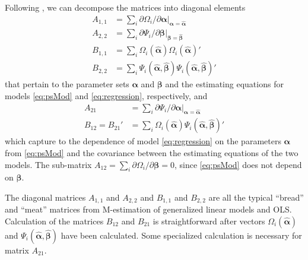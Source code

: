 \documentclass{statsoc} %
\begin{document}
Following , we %
can decompose the matrices into diagonal elements 
\begin{equation*}
    \begin{split}
        A_{1,1}&=\sum_i \partial \Omega_i/\partial \bm{\alpha}|_{\bm{\alpha}=\bm{\hat{\alpha}}}\\
        A_{2,2}&=\sum_i\partial\Psi_i/\partial \bm{\beta}|_{\bm{\beta}=\bm{\hat{\beta}}}\\
        B_{1,1}&=\sum_i\Omega_i(\bm{\hat\alpha})\Omega_i(\bm{\hat\alpha})'\\
        B_{2,2}&=\sum_i \Psi_i(\bm{\hat\alpha},\bm{\hat\beta})\Psi_i(\bm{\hat\alpha},\bm{\hat\beta})'
    \end{split}
\end{equation*}
 that pertain to the parameter sets $\bm{\alpha}$ and $\bm{\beta}$ and the estimating equations for models \eqref{eq:psMod} and  \eqref{eq:regression}, respectively, and 
 \begin{equation*}
     \begin{split}
         A_{21}&=\sum_i\partial\Psi_i/\partial \bm{\alpha}|_{\bm{\alpha}=\bm{\hat{\alpha}}}\\
         B_{12}=B_{21}'&=\sum_i \Omega_i(\bm{\hat{\alpha}})\Psi_i(\bm{\hat{\alpha}},\bm{\hat{\beta}})'
     \end{split}
 \end{equation*}
 which capture to the dependence of model \eqref{eq:regression} on the parameters $\bm{\alpha}$ from \eqref{eq:psMod} and the covariance between the estimating equations of the two models. 
The sub-matrix $A_{12}=\sum_i \partial \Omega_i/\partial \bm{\beta}=0$, since \eqref{eq:psMod} does not depend on $\bm{\beta}$.

The diagonal matrices $A_{1,1}$ and $A_{2,2}$ and $B_{1,1}$ and $B_{2,2}$ are all the typical ``bread'' and ``meat'' matrices from M-estimation of generalized linear models and OLS. 
Calculation of the matrices $B_{12}$ and $B_{21}$ is straightforward after vectors $\Omega_i(\bm{\hat{\alpha}})$ and $\Psi_i(\bm{\hat{\alpha}},\bm{\hat{\beta}})$ have been calculated.
Some specialized calculation is necessary for matrix $A_{21}$. 
\end{document}
